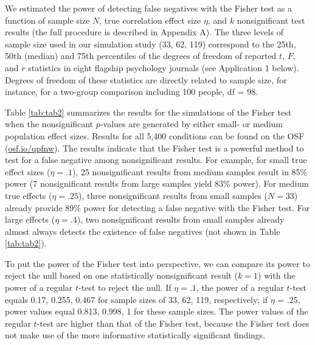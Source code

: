 \documentclass{article}
\begin{document}
We estimated the power of detecting false negatives with the Fisher test as a function of sample size $N$, true correlation effect size $\eta$, and $k$ nonsignificant test results (the full procedure is described in Appendix A). The three levels of sample size used in our simulation study (33, 62, 119) correspond to the 25th, 50th (median) and 75th percentiles of the degrees of freedom of reported $t$, $F$, and $r$ statistics in eight flagship psychology journals (see Application 1 below). Degrees of freedom of these statistics are directly related to sample size, for instance, for a two-group comparison including 100 people, df = 98. 

Table \ref{tab:tab2} summarizes the results for the simulations of the Fisher test when the nonsignificant $p$-values are generated by either small- or medium population effect sizes. Results for all 5,400 conditions can be found on the OSF (\url{osf.io/qpfnw}). The results indicate that the Fisher test is a powerful method to test for a false negative among nonsignificant results. For example, for small true effect sizes ($\eta=.1$), 25 nonsignificant results from medium samples result in 85\% power (7 nonsignificant results from large samples yield 83\% power). For medium true effects ($\eta=.25$), three nonsignificant results from small samples ($N=33$) already provide 89\% power for detecting a false negative with the Fisher test. For large effects ($\eta=.4$), two nonsignificant results from small samples already almost always detects the existence of false negatives (not shown in Table \ref{tab:tab2}).


To put the power of the Fisher test into perspective, we can compare its power to reject the null based on one statistically nonsignificant result ($k=1$) with the power of a regular $t$-test to reject the null. If $\eta=.1$, the power of a regular $t$-test equals 0.17, 0.255, 0.467 for sample sizes of 33, 62, 119, respectively; if $\eta$ = .25, power values equal 0.813, 0.998, 1 for these sample sizes. The power values of the regular $t$-test are higher than that of the Fisher test, because the Fisher test does not make use of the more informative statistically significant findings.
\end{document}
